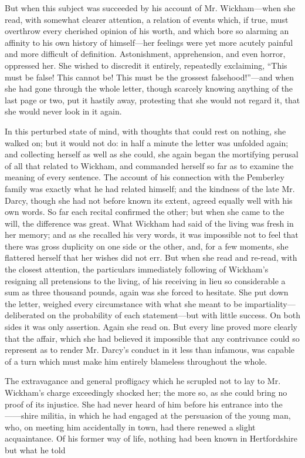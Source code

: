 \documentclass[10pt]{book}
\begin{document}
   But when this subject was succeeded by his account of Mr. Wickham—when
she read, with somewhat clearer attention, a relation of events which,
if true, must overthrow every cherished opinion of his worth, and which
bore so alarming an affinity to his own history of himself—her feelings
were yet more acutely painful and more difficult of definition.
Astonishment, apprehension, and even horror, oppressed her. She wished
to discredit it entirely, repeatedly exclaiming, “This must be false!
This cannot be! This must be the grossest falsehood!”—and when she had
gone through the whole letter, though scarcely knowing anything of the
last page or two, put it hastily away, protesting that she would not
regard it, that she would never look in it again.
  

   In this perturbed state of mind, with thoughts that could rest on
nothing, she walked on; but it would not do: in half a minute the letter
was unfolded again; and collecting herself as well as she could, she
again began the mortifying perusal of all that related to Wickham, and
commanded herself so far as to examine the meaning of every sentence.
The account of his connection with
   the Pemberley family was exactly
what he had related himself; and the kindness of the late Mr. Darcy,
though she had not before known its extent, agreed equally well with his
own words. So far each recital confirmed the other; but when she came to
the will, the difference was great. What Wickham had said of the living
was fresh in her memory; and as she recalled his very words, it was
impossible not to feel that there was gross duplicity on one side or the
other, and, for a few moments, she flattered herself that her wishes did
not err. But when she read and re-read, with the closest attention, the
particulars immediately following of Wickham’s resigning all pretensions
to the living, of his receiving in lieu so considerable a sum as three
thousand pounds, again was she forced to hesitate. She put down the
letter, weighed every circumstance with what she meant to be
impartiality—deliberated on the probability of each statement—but with
little success. On both sides it was only assertion. Again she read on.
But every line proved more clearly that the affair, which she had
believed it impossible that any contrivance could so represent as to
render Mr. Darcy’s conduct in it less than infamous, was capable of a
turn which must make him entirely blameless throughout the whole.
  

   The extravagance and general profligacy which he scrupled not to lay to
Mr. Wickham’s charge exceedingly shocked her; the more so, as she could
bring no proof of its injustice. She had never heard of him before his
entrance into the ——shire militia, in which he had engaged at the
persuasion of the young man, who, on meeting him accidentally in town,
had there renewed a slight acquaintance. Of his former way of life,
nothing had been known in Hertfordshire but what he told
  
\end{document}
